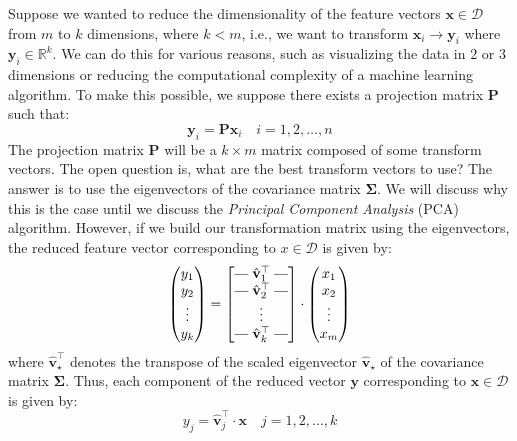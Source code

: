 \documentclass{article}[11pt]
\makeatletter
\newcommand{\brows}[1]{%
  \begin{bmatrix}
  \begin{array}{@{\protect\rotvert\;}c@{\;\protect\rotvert}}
  #1
  \end{array}
  \end{bmatrix}
}
\newcommand{\rotvert}{\rotatebox[origin=c]{90}{$\vert$}}
\newcommand{\rowsvdots}{\multicolumn{1}{@{}c@{}}{\vdots}}
\def\D{\mathcal{D}}
\makeatother
\begin{document}
Suppose we wanted to reduce the dimensionality of the feature vectors $\mathbf{x}\in\D$ from $m$ to $k$ dimensions, where $k<m$, 
i.e., we want to transform $\mathbf{x}_{i}\rightarrow\mathbf{y}_{i}$ where $\mathbf{y}_{i}\in\mathbb{R}^{k}$. 
We can do this for various reasons, such as visualizing the data in $2 $ or $3 $ dimensions or reducing the computational complexity of a machine learning algorithm.
To make this possible, we suppose there exists a projection matrix $\mathbf{P}$ such that:
\begin{equation}
   \mathbf{y}_{i} = \mathbf{P}\mathbf{x}_{i}\quad{i=1,2,\dots,n}
\end{equation}
The projection matrix $\mathbf{P}$ will be a $k\times{m}$ matrix composed of some transform vectors. The open question is, what are the best transform vectors to use? The answer is to use the eigenvectors of the covariance matrix $\mathbf{\Sigma}$.
We will discuss why this is the case until we discuss the \emph{Principal Component Analysis} (PCA) algorithm.
However, if we build our transformation matrix using the eigenvectors, the reduced feature vector corresponding to $x\in\D$ is given by:
\begin{equation}
   \begin{pmatrix}
      y_{1} \\
      y_{2} \\
      \vdots \\
      y_{k}
   \end{pmatrix} = \brows{\hat{\mathbf{v}}_1^\top \\ \hat{\mathbf{v}}_2^\top \\ \rowsvdots \\ \hat{\mathbf{v}}_k^\top}
   \cdot
   \begin{pmatrix}
      x_{1} \\
      x_{2} \\
      \vdots \\
      x_{m}
   \end{pmatrix}
\end{equation}
where $\hat{\mathbf{v}}_{\star}^{\top}$ denotes the transpose of the scaled eigenvector $\hat{\mathbf{v}}_{\star}$ of the covariance matrix $\mathbf{\Sigma}$.
Thus, each component of the reduced vector $\mathbf{y}$ corresponding to $\mathbf{x}\in\D$ is given by:
\begin{equation}
   y_{j} = \hat{\mathbf{v}}_{j}^{\top}\cdot\mathbf{x}\quad{j=1,2,\dots,k}
\end{equation}
\end{document}
